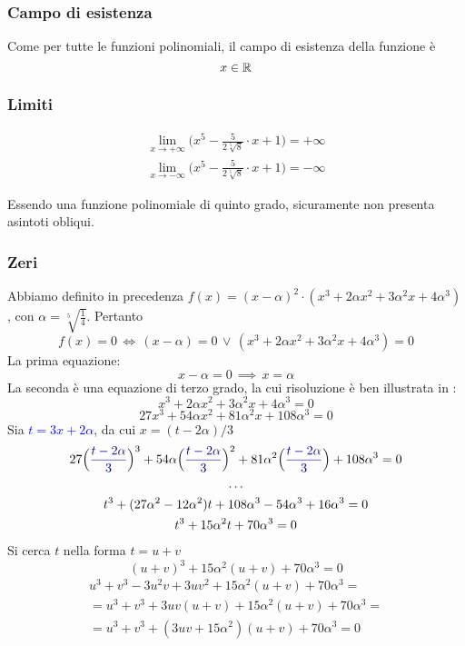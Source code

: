 \documentclass[a4paper, oneside, titlepage, reqno]{book}
\newcommand{\blue}[1]{\textcolor{blue}{#1}}
\begin{document}
\subsubsection*{Campo di esistenza}

Come per tutte le funzioni polinomiali, il campo di esistenza della funzione è 
\[
x\in\mathbb{R}
\]

\subsubsection*{Limiti}

\begin{gather*}
\lim_{x\to+\infty}\Big(x^5-\frac{5}{2\sqrt[5]{8}}\cdot x+1\Big)=+\infty\\
\lim_{x\to-\infty}\Big(x^5-\frac{5}{2\sqrt[5]{8}}\cdot x+1\Big)=-\infty
\end{gather*}

Essendo una funzione polinomiale di quinto grado, sicuramente non presenta asintoti obliqui.

\subsubsection*{Zeri}

Abbiamo definito in precedenza $f(x)=(x-\alpha)^2\cdot (x^3+2\alpha x^2+3\alpha^2x+4\alpha^3)$, con $\alpha=\sqrt[5]{\frac{1}{4}}$. Pertanto
\[
f(x)=0\,\iff\, (x-\alpha)=0\,\lor\,(x^3+2\alpha x^2+3\alpha^2x+4\alpha^3)=0
\]
La prima equazione:
\[x-\alpha=0\,\implies\, x=\alpha\]
La seconda è una equazione di terzo grado, la cui risoluzione è ben illustrata in \textcite[1-4]{eq:ter}:
\[x^3+2\alpha x^2+3\alpha^2x+4\alpha^3=0\]  %
\[27x^3+54\alpha x^2+81\alpha^2 x + 108 \alpha^3=0\]
Sia \blue{$t=3x+2\alpha$}, da cui $x=(t-2\alpha)/3$
\begin{gather*}
27\Big(\blue{\frac{t-2\alpha}{3}}\Big)^3+54\alpha \Big(\blue{\frac{t-2\alpha}{3}}\Big)^2+81\alpha^2 \Big(\blue{\frac{t-2\alpha}{3}}\Big) + 108 \alpha^3=0\\
\dots\\
t^3+(27\alpha^2-12\alpha^2)t+108\alpha^3-54\alpha^3+16\alpha^3=0\\
t^3+15\alpha^2t+70\alpha^3=0
\end{gather*}
Si cerca $t$ nella forma $t=u+v$
\[
(u+v)^3+15\alpha^2(u+v)+70\alpha^3=0
\]
\begin{multline*}
u^3+v^3-3u^2v+3uv^2+15\alpha^2(u+v)+70\alpha^3=\\
=u^3+v^3+3uv(u+v)+15\alpha^2(u+v)+70\alpha^3=\\
=u^3+v^3+(3uv+15\alpha^2)(u+v)+70\alpha^3=0
\end{multline*}
\end{document}
